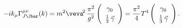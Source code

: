 \begin{equation*}
  -ik_\mu\Gamma_{J\smash[t]{\Jbar}}^{\mu\nu}(k)=m^2\veva^{\!2}\,
  \frac{\pi^2}{g^2}
  \left(\begin{array}{c}\gamma_0\\[1mm] \tfrac13\,\vec\gamma\end{array}
  \right)= \frac{\pi^2}{4}T^4\left(\begin{array}{c}\gamma_0\\[1mm]
  \tfrac13\,\vec\gamma\end{array} \right).
\end{equation*}

